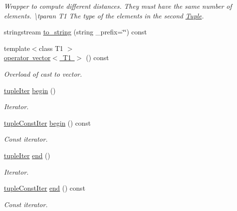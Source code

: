 \begin{DoxyCompactItemize}
\begin{DoxyCompactList}\small\item\em Wrapper to compute different distances. They must have the same number of elements. \textbackslash{}tparan T1 The type of the elements in the second \mbox{\hyperlink{class_tuple}{Tuple}}. \end{DoxyCompactList}\item 
stringstream \mbox{\hyperlink{class_tuple_a029b06891c82353ae40c13199830e90a}{to\+\_\+string}} (string \+\_\+prefix=\char`\"{}\char`\"{}) const
\item 
{\footnotesize template$<$class T1 $>$ }\\\mbox{\hyperlink{class_tuple_a924a25df1578ffab148c69a1a1000491}{operator vector$<$ T1 $>$}} () const
\begin{DoxyCompactList}\small\item\em Overload of cast to vector. \end{DoxyCompactList}\item 
\mbox{\hyperlink{maths_8hh_ad22dcdeefda7d41523cc1604953eb6cc}{tuple\+Iter}} \mbox{\hyperlink{class_tuple_a205dfb3c3dcad03ced830b5c9687d225}{begin}} ()
\begin{DoxyCompactList}\small\item\em Iterator. \end{DoxyCompactList}\item 
\mbox{\hyperlink{maths_8hh_a2eba794860251c1b30e532df32ee4d1b}{tuple\+Const\+Iter}} \mbox{\hyperlink{class_tuple_ab5d618dac69995db6adb0e657cd73bb3}{begin}} () const
\begin{DoxyCompactList}\small\item\em Const iterator. \end{DoxyCompactList}\item 
\mbox{\hyperlink{maths_8hh_ad22dcdeefda7d41523cc1604953eb6cc}{tuple\+Iter}} \mbox{\hyperlink{class_tuple_a345d8a3efbf58fe4cc7295c3cf66e8ab}{end}} ()
\begin{DoxyCompactList}\small\item\em Iterator. \end{DoxyCompactList}\item 
\mbox{\hyperlink{maths_8hh_a2eba794860251c1b30e532df32ee4d1b}{tuple\+Const\+Iter}} \mbox{\hyperlink{class_tuple_ac55a72437773f17dd8fbccf866d7e7eb}{end}} () const
\begin{DoxyCompactList}\small\item\em Const iterator. \end{DoxyCompactList}\end{DoxyCompactItemize}
